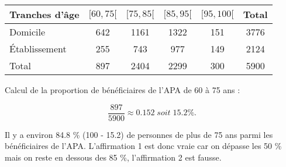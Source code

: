 \documentclass[a4paper,11pt]{exam}
\begin{document}
\begin{questions}
\begin{parts}
		\begin{tabular}{|@{\ }l@{\ }|@{\ }c@{\ }|@{\ }c@{\ }|@{\ }c@{\ }|@{\ }c@{\ }|@{\ }c@{\ }|}
			\hline
			Tranches d'âge  & $[60 , 75[$ & $[75, 85[$ & $[85, 95[$ & $[95, 100[$ & Total \\ \hline
			Domicile        & 642         & 1161       & 1322       & 151         & 3776  \\ \hline
			\'Etablissement & 255         & 743        & 977        & 149         & 2124  \\ \hline
			Total           & 897         & 2404       & 2299       & 300         & 5900  \\ \hline
		\end{tabular}
	\end{parts}

	\question 
	
	Calcul de la proportion de bénéficiaires de l'APA de 60 à 75 ans :
	
	\begin{equation*}
		\frac{897}{5900} \approx \num{0.152} \; soit \; \num{15.2} \%.
	\end{equation*} 
	
	Il y a environ \num{84.8} \% (\num{100} - \num{15.2}) de personnes de plus de 75 ans parmi les bénéficiaires de l'APA. L'affirmation 1 est donc vraie car on dépasse les 50 \% mais on reste en dessous des 85 \%, l'affirmation 2 est fausse.
	
	\question 
	
\end{questions}

\label{LastPage}
\end{document}
